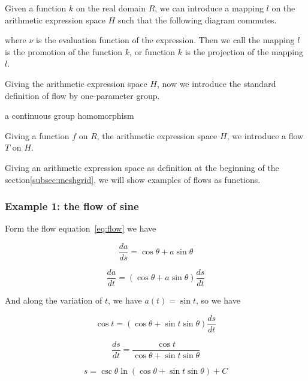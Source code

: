 \begin{definition}\label{def:projection}
Given a function $k$ on the real domain $R$, we can introduce a mapping $l$ on the arithmetic expression space $H$ such that the following diagram commutes.

\begin{center}
\end{center}

where $\nu$ is the evaluation function of the expression. Then we call the mapping $l$ is the promotion of the function $k$,
or function $k$ is the projection of the mapping $l$.
\end{definition}

Giving the arithmetic expression space $H$, now we introduce the standard definition of flow by one-parameter group.
\begin{definition}\label{def:flow}
a continuous group homomorphism
\end{definition}

Giving a function $f$ on $R$, the arithmetic expression space $H$, we introduce a flow $T$ on $H$.

Giving an arithmetic expression space as definition at the beginning of the section\ref{subsec:meshgrid},
we will show examples of flows as functions.

\subsubsection{Example 1: the flow of sine}\label{subsubsec:flow-of-sine}

Form the flow equation~\eqref{eq:flow} we have

$$\frac{da}{ds} = \cos \theta + a \sin \theta$$

$$\frac{da}{dt} = (\cos \theta + a \sin \theta)\frac{ds}{dt}$$

And along the variation of $t$, we have $a(t) = \sin t$, so we have

$$\cos t = (\cos \theta + \sin t \sin \theta)\frac{ds}{dt}$$

$$\frac{ds}{dt} = \frac{\cos t}{\cos \theta + \sin t \sin \theta}$$

$$ s = \csc \theta \ln (\cos \theta + \sin t \sin \theta) + C$$

